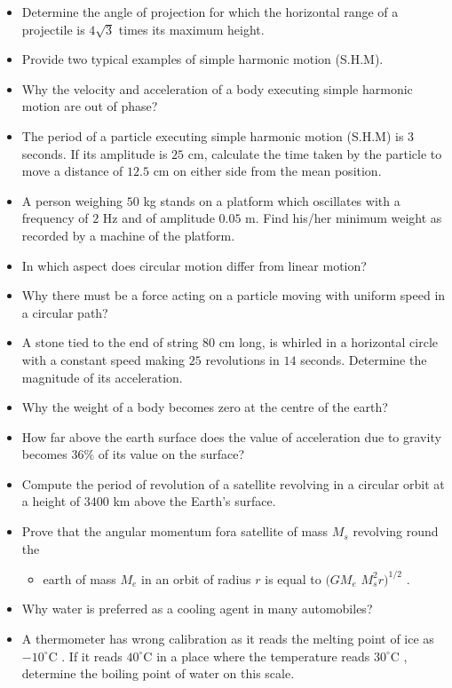 \documentclass{article}
\begin{document}
\begin{itemize}
\item Determine the angle of projection for which the horizontal range of a projectile is $ 4\sqrt{3}$ times its maximum height. 
\item Provide two typical examples of simple harmonic motion (S.H.M). 
\item Why the velocity and acceleration of a body executing simple harmonic motion are out of phase? 
\item The period of a particle executing simple harmonic motion (S.H.M) is $ 3$ seconds. If its amplitude is $ 25$ cm, calculate the time taken by the particle to move a distance of $ 12.5$ cm on either side from the mean position.
\item A person weighing $ 50$ kg stands on a platform which oscillates with a frequency of $ 2$ Hz and of amplitude $ 0.05$ m. Find his/her minimum weight as recorded by a machine of the platform. 
\item In which aspect does circular motion differ from linear motion? 
\item Why there must be a force acting on a particle moving with uniform speed in a circular path? 
\item A stone tied to the end of string $ 80$ cm long, is whirled in a horizontal circle with a constant speed making $ 25$ revolutions in $ 14$ seconds. Determine the magnitude of its acceleration. 
\item Why the weight of a body becomes zero at the centre of the earth? 
\item How far above the earth surface does the value of acceleration due to gravity becomes $ 36\%$ of its value on the surface? 
\item Compute the period of revolution of a satellite revolving in a circular orbit at a height of $ 3400$ km above the Earth’s surface. 
\item Prove that the angular momentum fora satellite of mass $ M_{s}$ revolving round the
 \begin{itemize}
\item earth of mass $ M_{e}$ in an orbit of radius $ r$ is equal to $ (G M_{e}$  $ M_{s}^{2}r)^{1/2}$ .
\end{itemize}
\item Why water is preferred as a cooling agent in many automobiles?
\item A thermometer has wrong calibration as it reads the melting point of ice as $ -10^{\circ}$C . If it reads $ 40^{\circ}$C in a place where the temperature reads $ 30^{\circ}$C ,  determine the boiling point of water on this scale.

\end{itemize}
\end{document}
